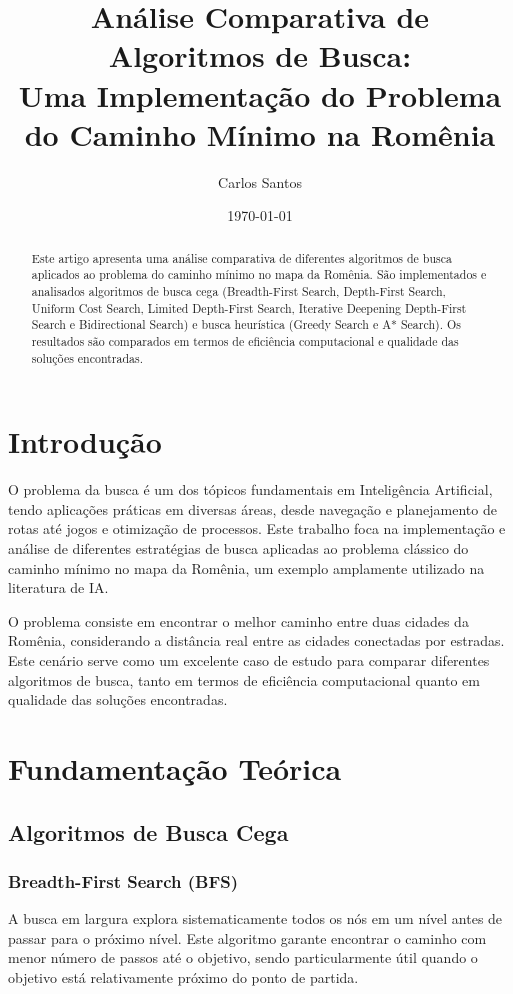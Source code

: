 \documentclass[12pt,a4paper]{article}
\title{Análise Comparativa de Algoritmos de Busca: \\ Uma Implementação do Problema do Caminho Mínimo na Romênia}
\author{Carlos Santos}
\date{\today}
\begin{document}
\maketitle

\begin{abstract}
Este artigo apresenta uma análise comparativa de diferentes algoritmos de busca aplicados ao problema do caminho mínimo no mapa da Romênia. São implementados e analisados algoritmos de busca cega (Breadth-First Search, Depth-First Search, Uniform Cost Search, Limited Depth-First Search, Iterative Deepening Depth-First Search e Bidirectional Search) e busca heurística (Greedy Search e A* Search). Os resultados são comparados em termos de eficiência computacional e qualidade das soluções encontradas.
\end{abstract}

\section{Introdução}
O problema da busca é um dos tópicos fundamentais em Inteligência Artificial, tendo aplicações práticas em diversas áreas, desde navegação e planejamento de rotas até jogos e otimização de processos. Este trabalho foca na implementação e análise de diferentes estratégias de busca aplicadas ao problema clássico do caminho mínimo no mapa da Romênia, um exemplo amplamente utilizado na literatura de IA.

O problema consiste em encontrar o melhor caminho entre duas cidades da Romênia, considerando a distância real entre as cidades conectadas por estradas. Este cenário serve como um excelente caso de estudo para comparar diferentes algoritmos de busca, tanto em termos de eficiência computacional quanto em qualidade das soluções encontradas.

\section{Fundamentação Teórica}

\subsection{Algoritmos de Busca Cega}

\subsubsection{Breadth-First Search (BFS)}
A busca em largura explora sistematicamente todos os nós em um nível antes de passar para o próximo nível. Este algoritmo garante encontrar o caminho com menor número de passos até o objetivo, sendo particularmente útil quando o objetivo está relativamente próximo do ponto de partida.
\end{document}
